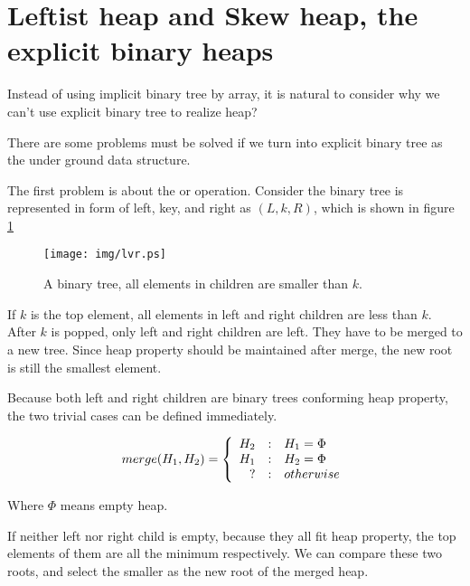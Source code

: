 \documentclass{article}
\begin{document}
\section{Leftist heap and Skew heap, the explicit binary heaps}
\label{ebheap}

Instead of using implicit binary tree by array, it is natural to
consider why we can't use explicit binary tree to realize heap?

There are some problems must be solved if we turn into explicit
binary tree as the under ground data structure.

The first problem is about the  or  operation.
Consider the binary tree is represented in form of left, key, and right as
$(L, k, R)$, which is shown in figure \ref{fig:lvr}

\begin{figure}[htbp]
       \begin{center}
       	  \texttt{[image: img/lvr.ps]}
        \caption{A binary tree, all elements in children are smaller than $k$.} \label{fig:lvr}
       \end{center}
\end{figure}

If $k$ is the top element, all elements in left and right children are less
than $k$. After $k$ is popped, only left and right children are left.
They have to be merged to a new tree. Since heap property should be maintained
after merge, the new root is still the smallest element.

Because both left and right children are binary trees conforming heap property,
the two trivial cases can be defined immediately.

\[
merge(H_1, H_2) = \left \{
  \begin{array}
  {r@{\quad:\quad}l}
  H_2 & H_1 = \Phi \\
  H_1 & H_2 = \Phi \\
  ? & otherwise
  \end{array}
\right.
\]

Where $\Phi$ means empty heap.

If neither left nor right child is empty, because they all fit
heap property, the top elements of them are all the minimum respectively.
We can compare these two roots,
and select the smaller as the new root of the merged heap.
\end{document}
